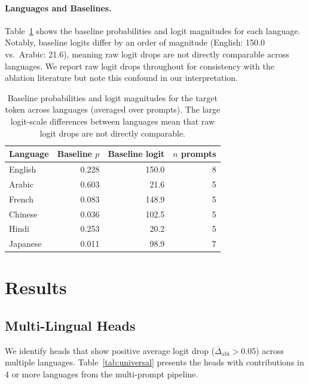 \documentclass[11pt]{article}
\begin{document}
\paragraph{Languages and Baselines.}
Table~\ref{tab:baselines} shows the baseline probabilities and logit magnitudes for each language.
Notably, baseline logits differ by an order of magnitude (English: 150.0 vs.\ Arabic: 21.6), meaning raw logit drops are not directly comparable across languages.
We report raw logit drops throughout for consistency with the ablation literature but note this confound in our interpretation.

\begin{table}[t]
\centering
\small
\begin{tabular}{lrrr}
\toprule
\textbf{Language} & \textbf{Baseline $p$} & \textbf{Baseline logit} & \textbf{$n$ prompts} \\
\midrule
English & 0.228 & 150.0 & 8 \\
Arabic  & 0.603 & 21.6  & 5 \\
French  & 0.083 & 148.9 & 5 \\
Chinese & 0.036 & 102.5 & 5 \\
Hindi   & 0.253 & 20.2  & 5 \\
Japanese & 0.011 & 98.9 & 7 \\
\bottomrule
\end{tabular}
\caption{Baseline probabilities and logit magnitudes for the target token across languages (averaged over prompts). The large logit-scale differences between languages mean that raw logit drops are not directly comparable.}
\label{tab:baselines}
\end{table}

\section{Results}
\label{sec:results}

\subsection{Multi-Lingual Heads}
\label{sec:results:universal}

We identify heads that show positive average logit drop ($\overline{\Delta}_{\text{abl}} > 0.05$) across multiple languages.
Table~\ref{tab:universal} presents the heads with contributions in 4 or more languages from the multi-prompt pipeline.
\end{document}
